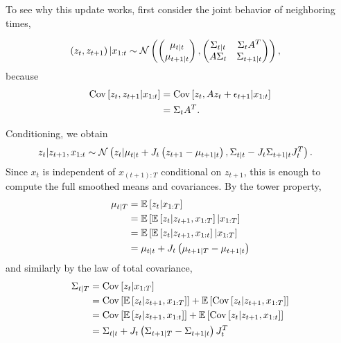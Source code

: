 \documentclass[14pt]{extarticle}
\begin{document}
To see why this update works, first consider the joint behavior of neighboring
times,

\begin{align*}
   \left(z_{t}, z_{t + 1}\right) \vert x_{1:t} &\sim \mathcal{N}\left(
\begin{pmatrix}
  \mu_{t \vert t} \\
  \mu_{t + 1 \vert t}
\end{pmatrix},
\begin{pmatrix}
  \Sigma_{t \vert t} & \Sigma_{t} A^{T} \\
  A \Sigma_{t} & \Sigma_{t + 1 \vert t}
\end{pmatrix}\right),
\end{align*}
because
\begin{align*}
  \mathrm{Cov}\left[{z_{t}, z_{t + 1} \vert x_{1:t}}\right] &= \mathrm{Cov}\left[{z_{t}, Az_{t} + \epsilon_{t + 1} \vert x_{1:t}}\right] \\
  &= \Sigma_{t}A^{T}.
\end{align*}

Conditioning, we obtain
\begin{align*}
  z_{t} \vert z_{t + 1}, x_{1:t} &\sim \mathcal{N}\left(
  z_{t} \vert \mu_{t \vert t} + J_{t}\left(z_{t + 1} - \mu_{t + 1 \vert t}\right),
  \Sigma_{t \vert t} - J_{t} \Sigma_{t + 1 \vert t} J_{t}^{T}
  \right).
\end{align*}
Since $x_{t}$ is independent of $x_{(t + 1): T}$ conditional on $z_{t + 1}$,
this is enough to compute the full smoothed means and covariances. By the tower
property,
\begin{align*}
  \mu_{t \vert T} &= \mathbb{E}\left[{z_{t} \vert x_{1:T}}\right] \\
  &= \mathbb{E}\left[{\mathbb{E}\left[{z_{t} \vert z_{t + 1}, x_{1 : T}}\right] \vert x_{1:T}}\right] \\
  &= \mathbb{E}\left[{\mathbb{E}\left[{z_{t} \vert z_{t + 1}, x_{1:t}}\right] \vert x_{1:T}}\right] \\
  &= \mu_{t \vert t} + J_{t}\left(\mu_{t + 1 \vert T} - \mu_{t + 1 \vert t}\right)
\end{align*}
and similarly by the law of total covariance,
\begin{align*}
  \Sigma_{t\vert T} &= \mathrm{Cov}\left[{z_{t} \vert x_{1:T}}\right] \\
  &= \mathrm{Cov}\left[{\mathbb{E}\left[{z_{t} \vert z_{t + 1}, x_{1:T}}\right]}\right] + \mathbb{E}\left[{\mathrm{Cov}\left[{z_{t} \vert z_{t + 1}, x_{1:T}}\right]}\right] \\
  &= \mathrm{Cov}\left[{\mathbb{E}\left[{z_{t} \vert z_{t + 1}, x_{1:t}}\right]}\right] + \mathbb{E}\left[{\mathrm{Cov}\left[{z_{t} \vert z_{t + 1}, x_{1:t}}\right]}\right] \\
  &= \Sigma_{t \vert t} + J_{t}\left(\Sigma_{t + 1 \vert T} - \Sigma_{t + 1 \vert t}\right) J_{t}^{T}
\end{align*}
\end{document}
